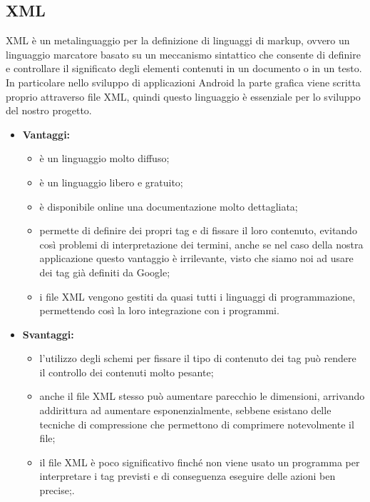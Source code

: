 \subsection{XML}
	
	XML è un metalinguaggio per la definizione di linguaggi di markup, ovvero un linguaggio marcatore basato su un meccanismo sintattico che consente di definire e controllare il significato degli elementi contenuti in un documento o in un testo.
	In particolare nello sviluppo di applicazioni Android la parte grafica viene scritta proprio attraverso file XML, quindi questo linguaggio è essenziale per lo sviluppo del nostro progetto.
	
	\begin{itemize}
		\item \textbf{Vantaggi:}
			\begin{itemize}
				\item è un linguaggio molto diffuso;
				\item è un linguaggio libero e gratuito;
				\item è disponibile online una documentazione molto dettagliata;
				\item permette di definire dei propri tag e di fissare il loro contenuto, evitando così problemi di interpretazione dei termini, anche se nel caso della nostra applicazione questo vantaggio è irrilevante, visto che siamo noi ad usare dei tag già definiti da Google;
				\item i file XML vengono gestiti da quasi tutti i linguaggi di programmazione, permettendo così la loro integrazione con i programmi.
			\end{itemize}
		\item \textbf{Svantaggi:}
			\begin{itemize}
				\item l'utilizzo degli schemi per fissare il tipo di contenuto dei tag può rendere il controllo dei contenuti molto pesante;
				\item anche il file XML stesso può aumentare parecchio le dimensioni, arrivando addirittura ad aumentare esponenzialmente, sebbene esistano delle tecniche di compressione che permettono di comprimere notevolmente il file;
				\item il file XML è poco significativo finché non viene usato un programma per interpretare i tag previsti e di conseguenza eseguire delle azioni ben precise;.
			\end{itemize}
	\end{itemize}
	

